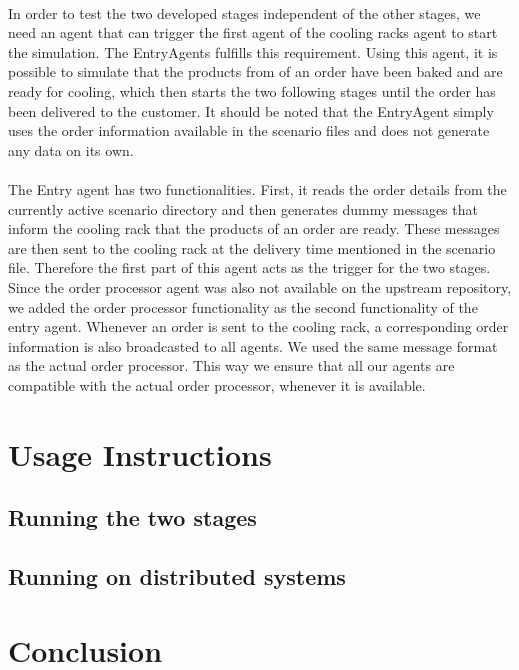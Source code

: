 \documentclass[11pt, a4paper]{article}
\begin{document}
\paragraph{}
In order to test the two developed stages independent of the other stages, we need an agent that can trigger the first agent of the cooling racks agent to start the simulation. The EntryAgents fulfills this requirement. Using this agent, it is possible to simulate that the products from of an order have been baked and are ready for cooling, which then starts the two following stages until the order has been delivered to the customer. It should be noted that the EntryAgent simply uses the order information available in the scenario files and does not generate any data on its own.

\paragraph{}
The Entry agent has two functionalities. First, it reads the order details from the currently active scenario directory and then generates dummy messages that inform the cooling rack that the products of an order are ready. These messages are then sent to the cooling rack at the delivery time mentioned in the scenario file. Therefore the first part of this agent acts as the trigger for the two stages. Since the order processor agent was also not available on the upstream repository, we added the order processor functionality as the second functionality of the entry agent. Whenever an order is sent to the cooling rack, a corresponding order information is also broadcasted to all agents. We used the same  message format as the actual order processor. This way we ensure that all our agents are compatible with the actual order processor, whenever it is available.

\section{Usage Instructions}

\subsection{Running the two stages}

\subsection{Running on distributed systems}

\section{Conclusion}
\end{document}
